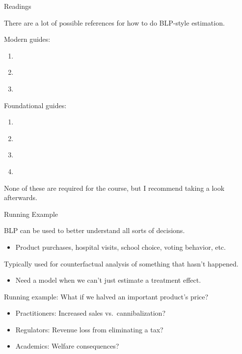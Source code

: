 \documentclass[aspectratio=169,t,11pt,table]{beamer}
\begin{document}
\begin{frame}{Readings}
    \begin{wideitemize}
        \item There are a lot of possible references for how to do BLP-style estimation.
        \pause
        \item Modern guides:
        \begin{enumerate}
            \item \cite{berry2021foundations}
            \item \cite{conlon2020best}
            \item \cite{conlon2025incorporating}
        \end{enumerate}
        \pause
        \item Foundational guides:
        \begin{enumerate}
            \item \cite*{berry1995automobile}
            \item \cite{nevo2000practitioner}
            \item \cite{petrin2002quantifying}
            \item \cite*{berry2004differentiated}
        \end{enumerate}
        \pause
        \item None of these are required for the course, but I recommend taking a look afterwards.
    \end{wideitemize}
\end{frame}

\begin{frame}{Running Example}
    \begin{wideitemize}
        \item BLP can be used to better understand all sorts of decisions.
        \begin{itemize}
            \item Product purchases, hospital visits, school choice, voting behavior, etc.
        \end{itemize}
        \pause
        \item Typically used for \alert{counterfactual analysis} of something that hasn't happened.
        \begin{itemize}
            \item Need a model when we can't just estimate a treatment effect.
        \end{itemize}
        \pause
        \item Running example: \alert{What if we halved an important product's price?}
        \begin{itemize}
            \item Practitioners: Increased sales vs.\ cannibalization?
            \item Regulators: Revenue loss from eliminating a tax?
            \item Academics: Welfare consequences?
        \end{itemize}
    \end{wideitemize}
\end{frame}
\end{document}

